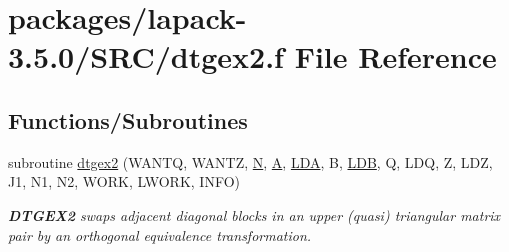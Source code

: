 \hypertarget{dtgex2_8f}{}\section{packages/lapack-\/3.5.0/\+S\+R\+C/dtgex2.f File Reference}
\label{dtgex2_8f}
\subsection*{Functions/\+Subroutines}
\begin{DoxyCompactItemize}
\item 
subroutine \hyperlink{group__doubleGEauxiliary_gaa3c93490c68259c80285d72cb61cbd99}{dtgex2} (W\+A\+N\+T\+Q, W\+A\+N\+T\+Z, \hyperlink{polmisc_8c_a0240ac851181b84ac374872dc5434ee4}{N}, \hyperlink{classA}{A}, \hyperlink{example__user_8c_ae946da542ce0db94dced19b2ecefd1aa}{L\+D\+A}, B, \hyperlink{example__user_8c_a50e90a7104df172b5a89a06c47fcca04}{L\+D\+B}, Q, L\+D\+Q, Z, L\+D\+Z, J1, N1, N2, W\+O\+R\+K, L\+W\+O\+R\+K, I\+N\+F\+O)
\begin{DoxyCompactList}\small\item\em {\bfseries D\+T\+G\+E\+X2} swaps adjacent diagonal blocks in an upper (quasi) triangular matrix pair by an orthogonal equivalence transformation. \end{DoxyCompactList}\end{DoxyCompactItemize}
